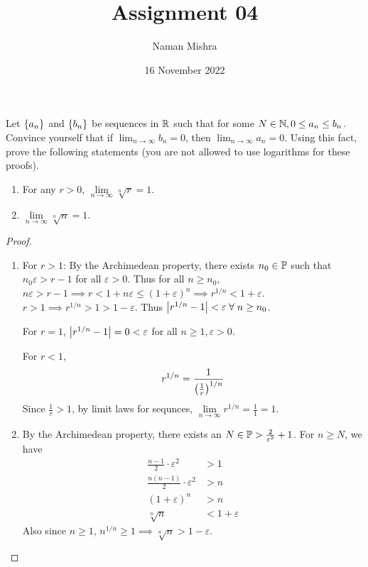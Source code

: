 \documentclass[12pt]{article}
\title{Assignment 04}
\author{Naman Mishra}
\date{16 November 2022}
\begin{document}
\maketitle

\begin{problem}
    Let $\set{a_{n}}$ and $\set{b_{n}}$ be sequences in $\R$ such that for some $N \in \N, 0 \leq a_{n} \leq b_{n}$.
    Convince yourself that if $\lim_{n \to \infty} b_{n} = 0$, then $\lim_{n \to \infty} a_{n} = 0$.
    Using this fact, prove the following statements (you are not allowed to use logarithms for these proofs).
    \begin{enumerate}[label=(\alph*)]
        \item For any $r > 0$, $\lim\limits_{n \to \infty} \sqrt[n]{r} = 1$.
        \item $\lim\limits_{n \to \infty} \sqrt[n]{n} = 1$.
    \end{enumerate}
\end{problem}

\begin{proof}
    \begin{enumerate}[label=(\alph*)]
        \item For $r > 1$: By the Archimedean property, there exists $n_{0} \in \P$ such that $n_{0} \varepsilon > r - 1$ for all $\varepsilon > 0$.
        Thus for all $n \geq n_{0}$, $n \varepsilon > r - 1 \implies r < 1 + n \varepsilon \leq (1 + \varepsilon)^{n} \implies r^{1/n} < 1 + \varepsilon$.
        $r > 1 \implies r^{1/n} > 1 > 1 - \varepsilon$.
        Thus $\abs{r^{1 / n} - 1} < \varepsilon \;\forall\; n \geq n_{0}$.

        For $r = 1$, $\abs{r^{1/n} - 1} = 0 < \varepsilon$ for all $n \geq  1, \varepsilon > 0$.

        For $r < 1$, \[
            r^{1/n} = \frac{1}{\paren{\frac{1}{r}}^{1/n}}
        \] Since $\frac{1}{r} > 1$, by limit laws for sequnces, $\lim\limits_{n \to \infty} r^{1/n} = \frac{1}{1} = 1$.
        
        \item By the Archimedean property, there exists an $N \in \P > \frac{2}{\varepsilon^{2}} + 1$. For $n \geq N$, we have
        \begin{align*}
            \frac{n - 1}{2} \cdot \varepsilon^{2} &> 1 \\
            \frac{n(n - 1)}{2} \cdot \varepsilon^{2} &> n \\
            (1 + \varepsilon)^{n} &> n \\
            \sqrt[n]{n} &< 1 + \varepsilon
        \end{align*}
        Also since $n \geq 1$, $n^{1 / n} \geq 1 \implies \sqrt[n]{n} > 1 - \varepsilon$. \qedhere
    \end{enumerate}
\end{proof}
\end{document}
